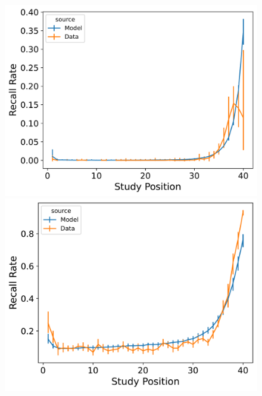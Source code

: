\documentclass[
  letterpaper,
  11pt,
  english,
  singlespacing,
  headsepline]{MastersDoctoralThesis}
\begin{document}
\begin{figure}
\begin{minipage}{0.33\linewidth}
\includegraphics{icmr_figures/Murdock1962_InstanceCMR_Model_Fitting_LL40_pnr-1.png}\end{minipage}%
%
\begin{minipage}{0.33\linewidth}
\includegraphics{icmr_figures/Murdock1962_InstanceCMR_Model_Fitting_LL40_spc-1.png}\end{minipage}%
\newline
\begin{minipage}{0.33\linewidth}

\end{minipage}
\end{figure}
\end{document}
